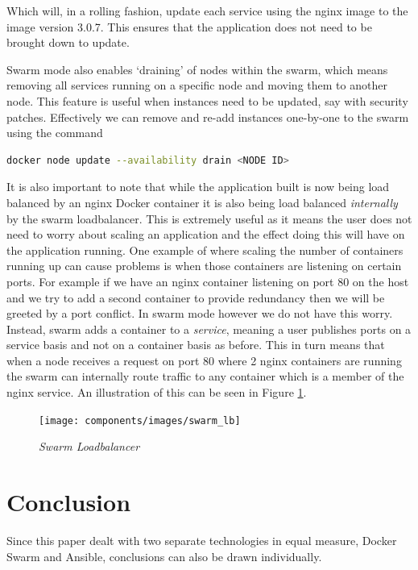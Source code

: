 \documentclass{article}
\begin{document}
Which will, in a rolling fashion, update each service using the nginx image to the image version 3.0.7. This ensures that the application does not need to be brought down to update.

Swarm mode also enables `draining' of nodes within the swarm, which means removing all services running on a specific node and moving them to another node. This feature is useful when instances need to be updated, say with security patches. Effectively we can remove and re-add instances one-by-one to the swarm using the command

\begin{lstlisting}[language=bash]
  docker node update --availability drain <NODE ID>
\end{lstlisting}

It is also important to note that while the application built is now being load balanced by an nginx Docker container it is also being load balanced \textit{internally} by the swarm loadbalancer. This is extremely useful as it means the user does not need to worry about scaling an application and the effect doing this will have on the application running. One example of where scaling the number of containers running up can cause problems is when those containers are listening on certain ports. For example if we have an nginx container listening on port 80 on the host and we try to add a second container to provide redundancy then we will be greeted by a port conflict. In swarm mode however we do not have this worry. Instead, swarm adds a container to a \textit{service}, meaning a user publishes ports on a service basis and not on a container basis as before. This in turn means that when a node receives a request on port 80 where 2 nginx containers are running the swarm can internally route traffic to any container which is a member of the nginx service. An illustration of this can be seen in Figure \ref{fig:swarm_lb}.

\begin{figure}[!h]
\centering
\texttt{[image: components/images/swarm\_lb]}
\caption{\em Swarm Loadbalancer}
\label{fig:swarm_lb}
\end{figure}

\newpage
\section{Conclusion}
\label{sec:Conclusion}
Since this paper dealt with two separate technologies in equal measure, Docker Swarm and Ansible, conclusions can also be drawn individually. 
\end{document}

